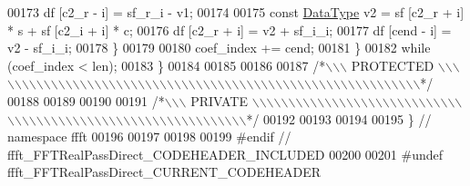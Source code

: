\begin{DoxyCode}
00173             df [c2\_r - i] = sf\_r\_i - v1;
00174 
00175             \textcolor{keyword}{const} \hyperlink{a00013_a831663a8e0b1414e80f82cd3d18b5b6b}{DataType}  v2 = sf [c2\_r + i] * s + sf [c2\_i + i] * c;
00176             df [c2\_r + i] = v2 + sf\_i\_i;
00177             df [cend - i] = v2 - sf\_i\_i;
00178         \}
00179 
00180         coef\_index += cend;
00181     \}
00182     \textcolor{keywordflow}{while} (coef\_index < len);
00183 \}
00184 
00185 
00186 
00187 \textcolor{comment}{/*\(\backslash\)\(\backslash\)\(\backslash\) PROTECTED \(\backslash\)\(\backslash\)\(\backslash\)\(\backslash\)\(\backslash\)\(\backslash\)\(\backslash\)\(\backslash\)\(\backslash\)\(\backslash\)\(\backslash\)\(\backslash\)\(\backslash\)\(\backslash\)\(\backslash\)\(\backslash\)\(\backslash\)\(\backslash\)\(\backslash\)\(\backslash\)\(\backslash\)\(\backslash\)\(\backslash\)\(\backslash\)\(\backslash\)\(\backslash\)\(\backslash\)\(\backslash\)\(\backslash\)\(\backslash\)\(\backslash\)\(\backslash\)\(\backslash\)\(\backslash\)\(\backslash\)\(\backslash\)\(\backslash\)\(\backslash\)\(\backslash\)\(\backslash\)\(\backslash\)\(\backslash\)\(\backslash\)\(\backslash\)\(\backslash\)\(\backslash\)\(\backslash\)\(\backslash\)\(\backslash\)\(\backslash\)\(\backslash\)\(\backslash\)\(\backslash\)\(\backslash\)\(\backslash\)\(\backslash\)\(\backslash\)\(\backslash\)\(\backslash\)\(\backslash\)*/}
00188 
00189 
00190 
00191 \textcolor{comment}{/*\(\backslash\)\(\backslash\)\(\backslash\) PRIVATE \(\backslash\)\(\backslash\)\(\backslash\)\(\backslash\)\(\backslash\)\(\backslash\)\(\backslash\)\(\backslash\)\(\backslash\)\(\backslash\)\(\backslash\)\(\backslash\)\(\backslash\)\(\backslash\)\(\backslash\)\(\backslash\)\(\backslash\)\(\backslash\)\(\backslash\)\(\backslash\)\(\backslash\)\(\backslash\)\(\backslash\)\(\backslash\)\(\backslash\)\(\backslash\)\(\backslash\)\(\backslash\)\(\backslash\)\(\backslash\)\(\backslash\)\(\backslash\)\(\backslash\)\(\backslash\)\(\backslash\)\(\backslash\)\(\backslash\)\(\backslash\)\(\backslash\)\(\backslash\)\(\backslash\)\(\backslash\)\(\backslash\)\(\backslash\)\(\backslash\)\(\backslash\)\(\backslash\)\(\backslash\)\(\backslash\)\(\backslash\)\(\backslash\)\(\backslash\)\(\backslash\)\(\backslash\)\(\backslash\)\(\backslash\)\(\backslash\)\(\backslash\)\(\backslash\)\(\backslash\)\(\backslash\)\(\backslash\)*/}
00192 
00193 
00194 
00195 \}   \textcolor{comment}{// namespace ffft}
00196 
00197 
00198 
00199 \textcolor{preprocessor}{#endif  // ffft\_FFTRealPassDirect\_CODEHEADER\_INCLUDED}
00200 
00201 \textcolor{preprocessor}{#undef ffft\_FFTRealPassDirect\_CURRENT\_CODEHEADER}

\end{DoxyCode}
